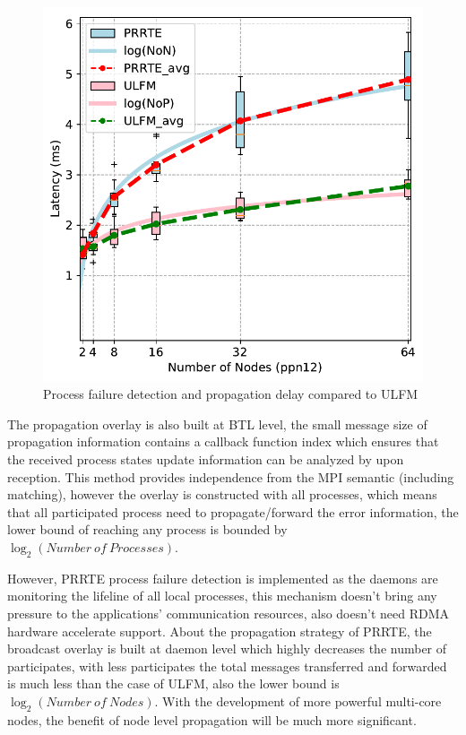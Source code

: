 \documentclass[sigconf]{acmart}
\newcommand{\prrte}[0]{\textsc{PRRTE}\xspace}
\newcommand{\ulfm}[0]{\textsc{ULFM}\xspace}
\newcommand{\mpi}[0]{\textsc{MPI}\xspace}
\begin{document}
\begin{figure}[h]
  \centering
  \includegraphics[width=\linewidth]{Process_Failure_log_fit.pdf}
  \caption{Process failure detection and propagation delay compared to \ulfm}
\end{figure}

The propagation overlay is also built at BTL level, the small message size of propagation information contains a callback function index which ensures that the received process states update information can be analyzed by upon reception. This method provides independence from the \mpi semantic (including matching), however the overlay is constructed with all processes, which means that all participated process need to propagate/forward the error information, the lower bound of reaching any process is bounded by $\log_2({Number\ of\ Processes})$.  

However, \prrte process failure detection is implemented as the daemons are monitoring the lifeline of all local processes, this mechanism doesn't bring any pressure to the applications' communication resources, also doesn't need RDMA hardware accelerate support. About the propagation strategy of \prrte, the broadcast overlay is built at daemon level which highly decreases the number of participates, with less participates the total messages transferred and forwarded is much less than the case of \ulfm, also the lower bound is $\log_2({Number\ of\ Nodes})$. With the development of more powerful multi-core nodes, the benefit of node level propagation will be much more significant.
\end{document}
